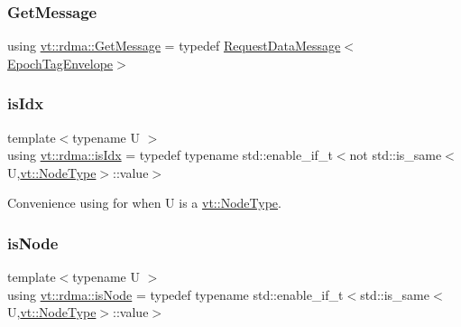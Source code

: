 \mbox{\label{namespacevt_1_1rdma_acce0da4c9ea1233c3f132c1971943653}} 
\subsubsection{\texorpdfstring{Get\+Message}{GetMessage}}
{\footnotesize\ttfamily using \hyperlink{namespacevt_1_1rdma_acce0da4c9ea1233c3f132c1971943653}{vt\+::rdma\+::\+Get\+Message} = typedef \hyperlink{structvt_1_1rdma_1_1_request_data_message}{Request\+Data\+Message}$<$\hyperlink{namespacevt_af23b58014ced6898422213a0e5e6a27a}{Epoch\+Tag\+Envelope}$>$}

\mbox{\label{namespacevt_1_1rdma_a5d8207f84dcd5b5115d78f295f9b6382}} 
\subsubsection{\texorpdfstring{is\+Idx}{isIdx}}
{\footnotesize\ttfamily template$<$typename U $>$ \\
using \hyperlink{namespacevt_1_1rdma_a5d8207f84dcd5b5115d78f295f9b6382}{vt\+::rdma\+::is\+Idx} = typedef typename std\+::enable\+\_\+if\+\_\+t$<$not std\+::is\+\_\+same$<$U,\hyperlink{namespacevt_a866da9d0efc19c0a1ce79e9e492f47e2}{vt\+::\+Node\+Type}$>$\+::value$>$}



Convenience using for when U is a \hyperlink{namespacevt_a866da9d0efc19c0a1ce79e9e492f47e2}{vt\+::\+Node\+Type}. 

\mbox{\label{namespacevt_1_1rdma_afeb91b098997f8b9e16bbcfba8651a1d}} 
\subsubsection{\texorpdfstring{is\+Node}{isNode}}
{\footnotesize\ttfamily template$<$typename U $>$ \\
using \hyperlink{namespacevt_1_1rdma_afeb91b098997f8b9e16bbcfba8651a1d}{vt\+::rdma\+::is\+Node} = typedef typename std\+::enable\+\_\+if\+\_\+t$<$std\+::is\+\_\+same$<$U,\hyperlink{namespacevt_a866da9d0efc19c0a1ce79e9e492f47e2}{vt\+::\+Node\+Type}$>$\+::value$>$}




